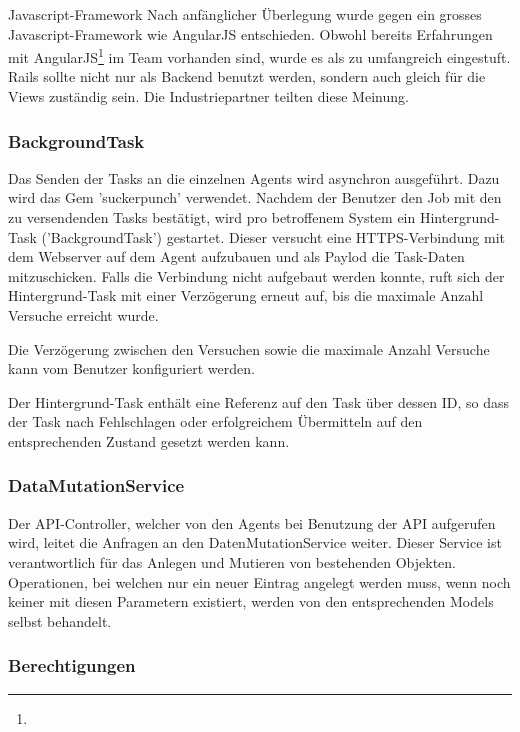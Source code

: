 \begin{decision}{Javascript-Framework}
Nach anfänglicher Überlegung wurde gegen ein grosses Javascript-Framework wie AngularJS entschieden. Obwohl bereits Erfahrungen mit AngularJS\footnote{} im Team vorhanden sind, wurde es als zu umfangreich eingestuft. Rails sollte nicht nur als Backend benutzt werden, sondern auch gleich für die Views zuständig sein. Die Industriepartner teilten diese Meinung. 
\end{decision}

\subsubsection*{BackgroundTask}

Das Senden der Tasks an die einzelnen Agents wird asynchron ausgeführt. Dazu wird das Gem 'sucker\textunderscore punch' verwendet. Nachdem der Benutzer den Job mit den zu versendenden Tasks bestätigt, wird pro betroffenem System ein Hintergrund-Task ('BackgroundTask') gestartet. Dieser versucht eine HTTPS-Verbindung mit dem Webserver auf dem Agent aufzubauen und als Paylod die Task-Daten mitzuschicken. Falls die Verbindung nicht aufgebaut werden konnte, ruft sich der Hintergrund-Task mit einer Verzögerung erneut auf, bis die maximale Anzahl Versuche erreicht wurde.

Die Verzögerung zwischen den Versuchen sowie die maximale Anzahl Versuche kann vom Benutzer konfiguriert werden.

Der Hintergrund-Task enthält eine Referenz auf den Task über dessen ID, so dass der Task nach Fehlschlagen oder erfolgreichem Übermitteln auf den entsprechenden Zustand gesetzt werden kann.

\subsubsection*{DataMutationService}

Der API-Controller, welcher von den Agents bei Benutzung der API aufgerufen wird, leitet die Anfragen an den DatenMutationService weiter. Dieser Service ist verantwortlich für das Anlegen und Mutieren von bestehenden Objekten. Operationen, bei welchen nur ein neuer Eintrag angelegt werden muss, wenn noch keiner mit diesen Parametern existiert, werden von den entsprechenden Models selbst behandelt. 

\subsubsection*{Berechtigungen}

